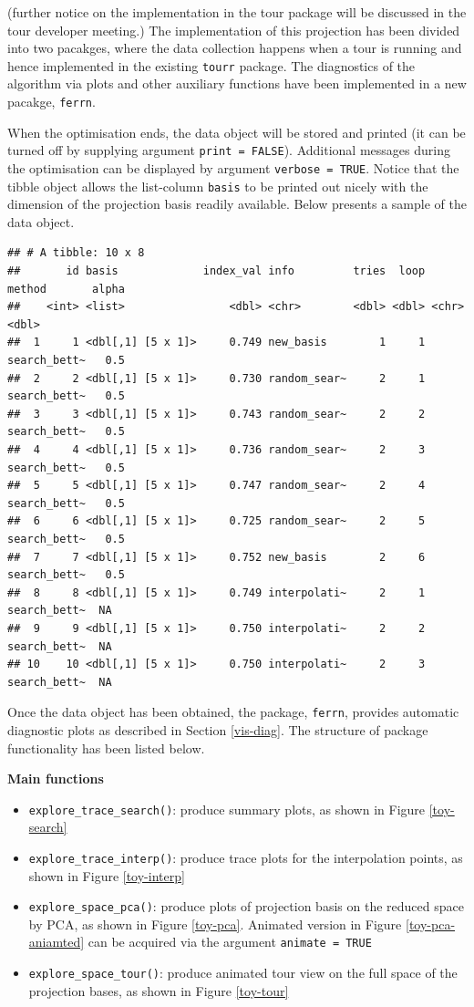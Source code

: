 \documentclass[12pt]{article}
\providecommand{\tightlist}{%
  \setlength{\itemsep}{0pt}\setlength{\parskip}{0pt}}
\begin{document}
(further notice on the implementation in the tour package will be discussed in the tour developer meeting.)
The implementation of this projection has been divided into two pacakges, where the data collection happens when a tour is running and hence implemented in the existing \texttt{tourr} package. The diagnostics of the algorithm via plots and other auxiliary functions have been implemented in a new pacakge, \texttt{ferrn}.

When the optimisation ends, the data object will be stored and printed (it can be turned off by supplying argument \texttt{print\ =\ FALSE}). Additional messages during the optimisation can be displayed by argument \texttt{verbose\ =\ TRUE}. Notice that the tibble object allows the list-column \texttt{basis} to be printed out nicely with the dimension of the projection basis readily available. Below presents a sample of the data object.

\begin{verbatim}
## # A tibble: 10 x 8
##       id basis             index_val info         tries  loop method       alpha
##    <int> <list>                <dbl> <chr>        <dbl> <dbl> <chr>        <dbl>
##  1     1 <dbl[,1] [5 x 1]>     0.749 new_basis        1     1 search_bett~   0.5
##  2     2 <dbl[,1] [5 x 1]>     0.730 random_sear~     2     1 search_bett~   0.5
##  3     3 <dbl[,1] [5 x 1]>     0.743 random_sear~     2     2 search_bett~   0.5
##  4     4 <dbl[,1] [5 x 1]>     0.736 random_sear~     2     3 search_bett~   0.5
##  5     5 <dbl[,1] [5 x 1]>     0.747 random_sear~     2     4 search_bett~   0.5
##  6     6 <dbl[,1] [5 x 1]>     0.725 random_sear~     2     5 search_bett~   0.5
##  7     7 <dbl[,1] [5 x 1]>     0.752 new_basis        2     6 search_bett~   0.5
##  8     8 <dbl[,1] [5 x 1]>     0.749 interpolati~     2     1 search_bett~  NA  
##  9     9 <dbl[,1] [5 x 1]>     0.750 interpolati~     2     2 search_bett~  NA  
## 10    10 <dbl[,1] [5 x 1]>     0.750 interpolati~     2     3 search_bett~  NA
\end{verbatim}

Once the data object has been obtained, the package, \texttt{ferrn}, provides automatic diagnostic plots as described in Section \ref{vis-diag}. The structure of package functionality has been listed below.

\textbf{Main functions}

\begin{itemize}
\tightlist
\item
  \texttt{explore\_trace\_search()}: produce summary plots, as shown in Figure \ref{toy-search}
\item
  \texttt{explore\_trace\_interp()}: produce trace plots for the interpolation points, as shown in Figure \ref{toy-interp}
\item
  \texttt{explore\_space\_pca()}: produce plots of projection basis on the reduced space by PCA, as shown in Figure \ref{toy-pca}. Animated version in Figure \ref{toy-pca-aniamted} can be acquired via the argument \texttt{animate\ =\ TRUE}
\item
  \texttt{explore\_space\_tour()}: produce animated tour view on the full space of the projection bases, as shown in Figure \ref{toy-tour}
\end{itemize}
\end{document}
